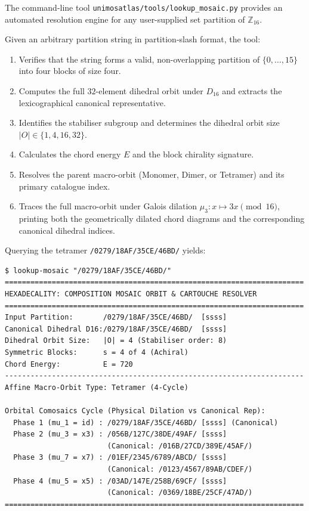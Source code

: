 The command-line tool \texttt{unimosatlas/tools/lookup\_mosaic.py} provides an automated resolution engine for any user-supplied set partition of $\mathbb{Z}_{16}$. 

Given an arbitrary partition string in partition-slash format, the tool:
\begin{enumerate}
    \item Verifies that the string forms a valid, non-overlapping partition of $\{0, \dots, 15\}$ into four blocks of size four.
    \item Computes the full $32$-element dihedral orbit under $D_{16}$ and extracts the lexicographical canonical representative.
    \item Identifies the stabiliser subgroup and determines the dihedral orbit size $|O| \in \{1, 4, 16, 32\}$.
    \item Calculates the chord energy $E$ and the block chirality signature.
    \item Resolves the parent macro-orbit (Monomer, Dimer, or Tetramer) and its primary catalogue index.
    \item Traces the full macro-orbit under Galois dilation $\mu_3 \colon x \mapsto 3x \pmod{16}$, printing both the geometrically dilated chord diagrams and the corresponding canonical dihedral indices.
\end{enumerate}

\begin{example}
Querying the tetramer \texttt{/0279/18AF/35CE/46BD/} yields:
{\small
\begin{verbatim}
$ lookup-mosaic "/0279/18AF/35CE/46BD/"
======================================================================
HEXADECALITY: COMPOSITION MOSAIC ORBIT & CARTOUCHE RESOLVER
======================================================================
Input Partition:       /0279/18AF/35CE/46BD/  [ssss]
Canonical Dihedral D16:/0279/18AF/35CE/46BD/  [ssss]
Dihedral Orbit Size:   |O| = 4 (Stabiliser order: 8)
Symmetric Blocks:      s = 4 of 4 (Achiral)
Chord Energy:          E = 720
----------------------------------------------------------------------
Affine Macro-Orbit Type: Tetramer (4-Cycle)

Orbital Comosaics Cycle (Physical Dilation vs Canonical Rep):
  Phase 1 (mu_1 = id) : /0279/18AF/35CE/46BD/ [ssss] (Canonical)
  Phase 2 (mu_3 = x3) : /056B/127C/38DE/49AF/ [ssss]
                        (Canonical: /016B/27CD/389E/45AF/)
  Phase 3 (mu_7 = x7) : /01EF/2345/6789/ABCD/ [ssss]
                        (Canonical: /0123/4567/89AB/CDEF/)
  Phase 4 (mu_5 = x5) : /03AD/147E/258B/69CF/ [ssss]
                        (Canonical: /0369/18BE/25CF/47AD/)
======================================================================
\end{verbatim}}
\end{example}


